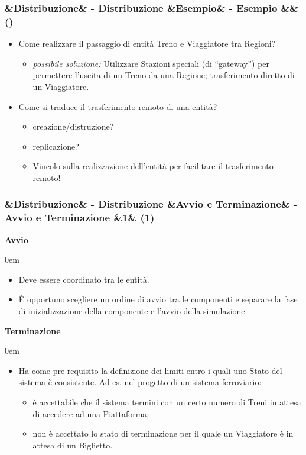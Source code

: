 \documentclass[slidestop,compress,blackandwhite]{beamer}
\newcommand{\ii}[1]{\textit{#1}}
\newcommand{\cm}[1]{\vspace{#1cm}}
\newcommand{\describe}[2]{
	\textbf{#1}\\
	\begin{addmargin}[2em]{0em}
		#2
	\end{addmargin}
}
\newcommand{\newtitle}[4]{
	#1 
	\ifx&#2&%
	\else
  		\large- #2
	\fi
	\ifx&#3&%
	\else
  		\normalsize- #3
	\fi
	\ifx&#4&%
	\else
  		\normalsize (#4)
	\fi
}
\newcommand{\newframe}[5]{
	\begin{frame}
		\frametitle{\newtitle{#1}{#2}{#3}{#4}}
		#5
	\end{frame}
}
\newcommand{\myitemize}[1]{
	\begin{itemize}\itemsep4pt
	#1
	\end{itemize}
}
\begin{document}
	\newframe{}{Distribuzione}{Esempio}{} {
		\myitemize {
			\item Come realizzare il passaggio di entità Treno e Viaggiatore tra Regioni?
			\myitemize {
				\item \ii{possibile soluzione:} Utilizzare Stazioni speciali (di ``gateway'') per permettere l'uscita di un Treno da una Regione; trasferimento diretto di un Viaggiatore.
			}
			\item Come si traduce il trasferimento remoto di una entità?
				\myitemize {
					\item creazione/distruzione?
					\item replicazione?
					\item Vincolo sulla realizzazione dell'entità per facilitare il trasferimento remoto!
				}
		}
	}
	
	\newframe{}{Distribuzione}{Avvio e Terminazione}{1}{
		\describe{Avvio}{
			\myitemize{
				\item Deve essere coordinato tra le entità.
				\item \`E opportuno scegliere un ordine di avvio tra le componenti e separare la fase di inizializzazione della componente e l'avvio della simulazione.
			}
		}
		\cm{0.1}
		\describe{Terminazione}{
			\myitemize{
				\item Ha come pre-requisito la definizione dei limiti entro i quali uno Stato del sistema è consistente. Ad es. nel progetto di un sistema ferroviario:
					\myitemize {
						\item è accettabile che il sistema termini con un certo numero di Treni in attesa di accedere ad una Piattaforma;
						\item non è accettato lo stato di terminazione per il quale un Viaggiatore è in attesa di un Biglietto.
					} 
			}
		}
	}
	
\end{document}

